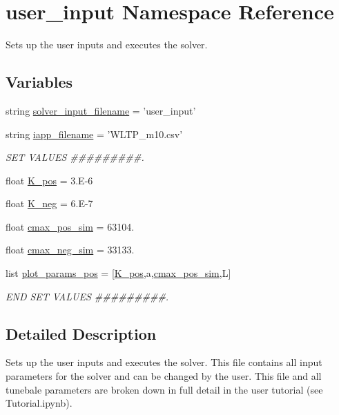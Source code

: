 \hypertarget{namespaceuser__input}{\section{user\-\_\-input Namespace Reference}
\label{namespaceuser__input}
}


Sets up the user inputs and executes the solver.  


\subsection*{Variables}
\begin{DoxyCompactItemize}
\item 
string \hyperlink{namespaceuser__input_a92a75cd7aa57960ca65957a1baa06d77}{solver\-\_\-input\-\_\-filename} = 'user\-\_\-input'
\item 
string \hyperlink{namespaceuser__input_af0a721bf4042ba266855bd73da684844}{iapp\-\_\-filename} = 'W\-L\-T\-P\-\_\-m10.\-csv'
\begin{DoxyCompactList}\small\item\em S\-E\-T V\-A\-L\-U\-E\-S \#\#\#\#\#\#\#\#\#. \end{DoxyCompactList}\item 
float \hyperlink{namespaceuser__input_ab1a8ebec490ba1301f818bd1c5f1f3fa}{K\-\_\-pos} = 3.\-E-\/6
\item 
float \hyperlink{namespaceuser__input_a64d0c5854299798787675bc91586023c}{K\-\_\-neg} = 6.\-E-\/7
\item 
float \hyperlink{namespaceuser__input_aa5b015cc7d0bda453c6163023448db72}{cmax\-\_\-pos\-\_\-sim} = 63104.
\item 
float \hyperlink{namespaceuser__input_ab7633a5e9c70aabfe6992e4fe521a1f9}{cmax\-\_\-neg\-\_\-sim} = 33133.
\item 
list \hyperlink{namespaceuser__input_a5bacef25baf63731923fbef674af4e9d}{plot\-\_\-params\-\_\-pos} = \mbox{[}\hyperlink{namespaceuser__input_ab1a8ebec490ba1301f818bd1c5f1f3fa}{K\-\_\-pos},a,\hyperlink{namespaceuser__input_aa5b015cc7d0bda453c6163023448db72}{cmax\-\_\-pos\-\_\-sim},L\mbox{]}
\begin{DoxyCompactList}\small\item\em E\-N\-D S\-E\-T V\-A\-L\-U\-E\-S \#\#\#\#\#\#\#\#\#. \end{DoxyCompactList}\end{DoxyCompactItemize}


\subsection{Detailed Description}
Sets up the user inputs and executes the solver. This file contains all input parameters for the solver and can be changed by the user. This file and all tunebale parameters are broken down in full detail in the user tutorial (see Tutorial.\-ipynb).

